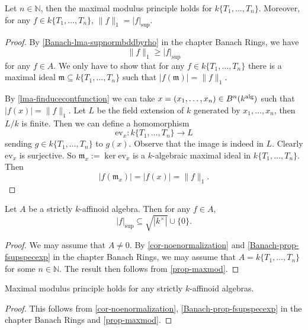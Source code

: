 \begin{proposition}\label{prop-maxmod}
    Let $n\in \mathbb{N}$, then the maximal modulus principle holds for $k\{T_1,\ldots,T_n\}$. Moreover, for any $f\in k\{T_1,\ldots,T_n\}$, $\|f\|_1=|f|_{\sup}$.
\end{proposition}
\begin{proof}
    By \cref{Banach-lma-supnormbddbyrho} in the chapter Banach Rings, we have
    \[
        \|f\|_1\geq |f|_{\sup}
    \]
    for any $f\in A$. We only have to show that for any $f\in k\{T_1,\ldots,T_n\}$ there is a maximal ideal $\mathfrak{m}\subseteq k\{T_1,\ldots,T_n\}$ such that $|f(\mathfrak{m})|=\|f\|_1$.

    By \cref{lma-finducecontfunction} we can take $x=(x_1,\ldots,x_n)\in B^n(k^{\mathrm{alg}})$ such that $|f(x)|=\|f\|_1$. Let $L$ be the field extension of $k$ generated by $x_1,\ldots,x_n$, then $L/k$ is finite. Then we can define a homomorphism
    \[
        \mathrm{ev}_x:  k\{T_1,\ldots,T_n\} \rightarrow L
    \]
    sending $g\in k\{T_1,\ldots,T_n\}$ to $g(x)$. Observe that the image is indeed in $L$. Clearly $\mathrm{ev}_x$ is surjective. So $\mathfrak{m}_x:=\ker \mathrm{ev}_x$ is a $k$-algebraic maximal ideal in $k\{T_1,\ldots,T_n\}$. Then
    \[
        |f(\mathfrak{m}_x)|=|f(x)|=\|f\|_1.  
    \]
\end{proof}


\begin{corollary}\label{cor-strictlyaffsupnorm}
    Let $A$ be a strictly $k$-affinoid algebra. Then for any $f\in A$,
    \[
        |f|_{\sup}\subseteq \sqrt{|k^{\times}|}\cup \{0\}.  
    \]
\end{corollary}
\begin{proof}
    We may assume that $A\neq 0$.
    By \cref{cor-noenormalization} and \cref{Banach-prop-fsupspecexp} in the chapter Banach Rings, we may assume that $A=k\{T_1,\ldots,T_n\}$ for some $n\in \mathbb{N}$. The result then follows from \cref{prop-maxmod}.
\end{proof}


\begin{corollary}\label{cor:maxmodprin}
    Maximal modulus principle holds for any strictly $k$-affinoid algebras.
\end{corollary}
\begin{proof}
    This follows from \cref{cor-noenormalization}, \cref{Banach-prop-fsupspecexp} in the chapter Banach Rings and \cref{prop-maxmod}.
\end{proof}

